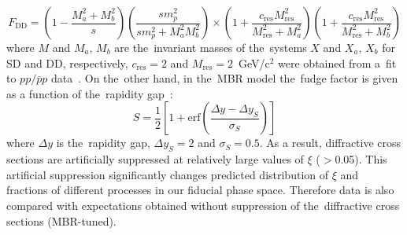 \begin{equation}
F_{\textrm{DD}}=\left(1-\frac{M_a^2+M_b^2}{s}\right)\left(\frac{sm^2_p}{sm^2_p+M_a^2M_b^2}\right)\times
\left(1+\frac{c_\textrm{res}M_\textrm{res}^2}{M_\textrm{res}^2+M_a^2}\right)\left(1+\frac{c_\textrm{res}M_\textrm{res}^2}{M_\textrm{res}^2+M_b^2}\right)
\end{equation}
where $M$ and $M_{a}$, $M_{b}$ are the~invariant masses of the~systems $X$ and $X_a$, $X_b$ for SD and DD, respectively, $c_\textrm{res}=2$ and $M_\textrm{res}=2$~GeV/c$^2$ were obtained from a~fit to $pp/\bar{p}p$ data~\cite{Sjostrand:2006za}. On the~other hand, in the~\ac{MBR} model the~fudge factor is given as a function of the~rapidity gap~\cite{MBR:intro}:
\begin{equation}
S=\frac{1}{2}\left[1+\textrm{erf}\left(\frac{\Delta y-\Delta y_S}{\sigma_S}\right)\right]
\end{equation}
where $\Delta y$ is the~rapidity gap, $\Delta y_S=2$ and $\sigma_S=0.5$. As a result, diffractive cross sections are artificially suppressed at 
relatively large values of $\xi$ ($>$0.05). This artificial suppression significantly changes predicted distribution of $\xi$ and fractions of different processes in our fiducial phase space. Therefore data is also compared with expectations obtained without suppression of the~diffractive cross sections (MBR-tuned).

